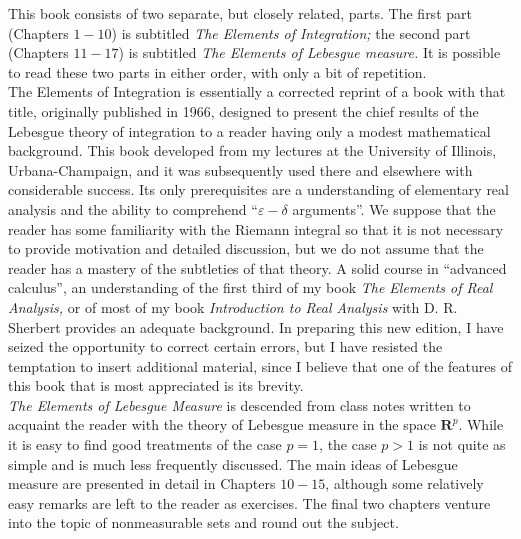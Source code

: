 %
%
\preface

\indent This book consists of two separate, but closely related, parts. The first part (Chapters $1-10$) is subtitled 
\textit{The Elements of Integration;} the second part (Chapters $11-17$) is subtitled \textit{The Elements of Lebesgue measure.} 
It is possible to read these two parts in either order, with only a bit of repetition.\\
\indent The Elements of Integration is essentially a corrected reprint of a book with that title, originally published in 1966, 
designed to present the chief results of the Lebesgue theory of integration to a reader having only a modest mathematical background. 
This book developed from my lectures at the University of Illinois, Urbana-Champaign, and it was subsequently used there and elsewhere 
with considerable success. Its only prerequisites are a understanding of elementary real analysis and the ability to comprehend ``$\varepsilon - \delta$ 
arguments''. We suppose that the reader has some familiarity with the Riemann integral so that it is not necessary to provide 
motivation and detailed discussion, but we do not assume that the reader has a mastery of the subtleties of that theory. A solid 
course in ``advanced calculus'', an understanding of the first third of my book \textit{The Elements of Real Analysis,} or of most 
of my book \textit{Introduction to Real Analysis} with D. R. Sherbert provides an adequate background. In preparing this new edition, 
I have seized the opportunity to correct certain errors, but I have resisted the temptation to insert additional material, since I 
believe that one of the features of this book that is most appreciated is its brevity.\\
\noindent \textit{The Elements of Lebesgue Measure} is descended from class notes written to acquaint the reader with the theory 
of Lebesgue measure in the space $\textbf{R}^p$. While it is easy to find good treatments of the case $p=1$, the case $p>1$ is not 
quite as simple and is much less frequently discussed. The main ideas of Lebesgue measure are presented in detail in Chapters $10-15$, 
although some relatively easy remarks are left to the reader as exercises. The final two chapters venture into the topic of 
nonmeasurable sets and round out the subject.\\
